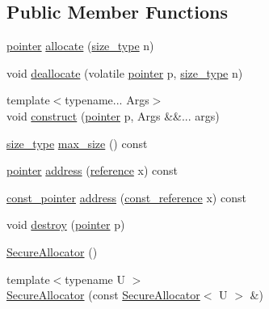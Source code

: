 \subsection*{Public Member Functions}
\begin{DoxyCompactItemize}
\item 
\hyperlink{class_json_1_1_secure_allocator_a442c09b3267622d23416d9072ea1afe9}{pointer} \hyperlink{class_json_1_1_secure_allocator_a9b7d7180b360ebd673bdcfab25c1d5a4}{allocate} (\hyperlink{class_json_1_1_secure_allocator_a61c258f0ae80af6982fae200b55a4dc9}{size\+\_\+type} n)
\item 
void \hyperlink{class_json_1_1_secure_allocator_a93c86d9e9031b81a046b3db8897811f2}{deallocate} (volatile \hyperlink{class_json_1_1_secure_allocator_a442c09b3267622d23416d9072ea1afe9}{pointer} p, \hyperlink{class_json_1_1_secure_allocator_a61c258f0ae80af6982fae200b55a4dc9}{size\+\_\+type} n)
\item 
{\footnotesize template$<$typename... Args$>$ }\\void \hyperlink{class_json_1_1_secure_allocator_acd466192ba41ea5468bd2f45ae9de9fb}{construct} (\hyperlink{class_json_1_1_secure_allocator_a442c09b3267622d23416d9072ea1afe9}{pointer} p, Args \&\&... args)
\item 
\hyperlink{class_json_1_1_secure_allocator_a61c258f0ae80af6982fae200b55a4dc9}{size\+\_\+type} \hyperlink{class_json_1_1_secure_allocator_a1ca352414d0ce358c0dca70fb26c674c}{max\+\_\+size} () const
\item 
\hyperlink{class_json_1_1_secure_allocator_a442c09b3267622d23416d9072ea1afe9}{pointer} \hyperlink{class_json_1_1_secure_allocator_a2f26b3dbf3cfffcc376844fb19733422}{address} (\hyperlink{class_json_1_1_secure_allocator_a55b243c56812b3852b59c1a9b0a21c65}{reference} x) const
\item 
\hyperlink{class_json_1_1_secure_allocator_a464b356817c78ea996cd3a7403f7e735}{const\+\_\+pointer} \hyperlink{class_json_1_1_secure_allocator_a228944048dd7266f219b52fd1958b4d5}{address} (\hyperlink{class_json_1_1_secure_allocator_a3f0327d609dcd1942c8c7fa4d4f227e5}{const\+\_\+reference} x) const
\item 
void \hyperlink{class_json_1_1_secure_allocator_a7316f4efeb3b992c69c94e345ac9f5cd}{destroy} (\hyperlink{class_json_1_1_secure_allocator_a442c09b3267622d23416d9072ea1afe9}{pointer} p)
\item 
\hyperlink{class_json_1_1_secure_allocator_aac964c7467309331882c1ad541e4d8e4}{Secure\+Allocator} ()
\item 
{\footnotesize template$<$typename U $>$ }\\\hyperlink{class_json_1_1_secure_allocator_afefbe83997eb1da2089229771957e6bd}{Secure\+Allocator} (const \hyperlink{class_json_1_1_secure_allocator}{Secure\+Allocator}$<$ U $>$ \&)
\end{DoxyCompactItemize}


